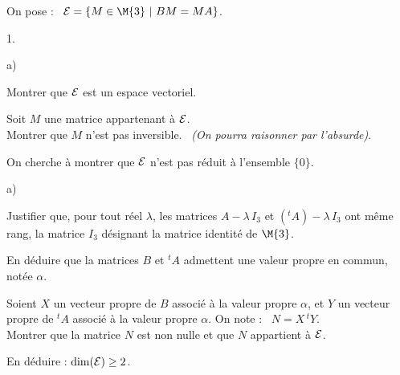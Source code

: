   \noindent
  On pose : \ ${\cal E} = \{M \in \M{3} \ | \ BM=MA \}$.
  
\begin{noliste}{1.}
  \setlength{\itemsep}{4mm}
  \setcounter{enumi}{3}
  \item 
  \begin{noliste}{a)}
    \setlength{\itemsep}{2mm}
    \item Montrer que ${\cal E}$ est un espace vectoriel.
    
    
    
  \item Soit $M$ une matrice appartenant à ${\cal E}$.\\
    Montrer que $M$ n'est pas inversible. \ {\it (On pourra raisonner
      par l'absurde)}.
    
    
  \end{noliste}
  
  \item On cherche à montrer que ${\cal E}$ n'est pas réduit à 
  l'ensemble $\{0\}$.
  \begin{noliste}{a)}
    \setlength{\itemsep}{2mm}
    \item Justifier que, pour tout réel $\lambda$, les matrices 
    $A-\lambda \, I_3$ et $({}^t A)- \lambda \, I_3$ ont même rang, 
    la matrice $I_3$ désignant la matrice identité de $\M{3}$.
    
    
    
    

    
    \item En déduire que la matrices $B$ et ${}^t A$ admettent une 
    valeur propre en commun, notée $\alpha$.
    
    
    
  \item Soient $X$ un vecteur propre de $B$ associé à la valeur propre
    $\alpha$, et $Y$ un vecteur propre de ${}^t A$ associé à la
    valeur propre $\alpha$. On note : \ $N=X \, {}^t Y$.\\
    Montrer que la matrice $N$ est non nulle et que $N$ appartient à
    ${\cal E}$.
    
    
    
    

    
  \item En déduire : $\dim({\cal E}) \geq 2$.
    
    

  \end{noliste}
\end{noliste}


